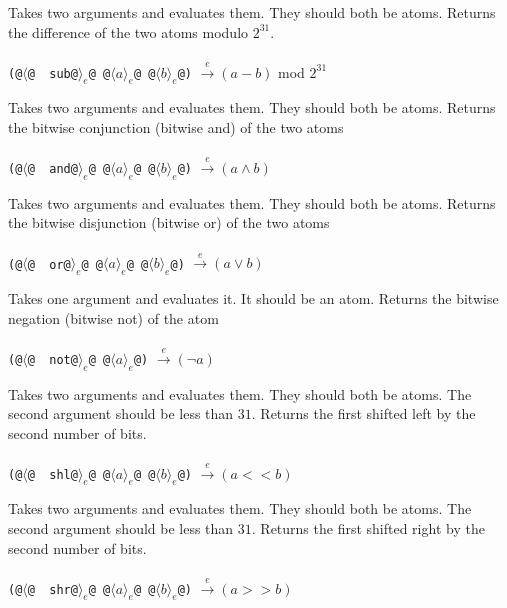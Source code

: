 \documentclass[twocolumn]{report}
\begin{document}
\begin{description}[leftmargin=1.5cm,labelwidth=1.3cm]
\item [\texttt{~~sub}]
Takes two arguments and evaluates them.
They should both be atoms.
Returns the difference of the two atoms modulo $2^{31}$. \\
\\
\texttt{(@$\langle$@~~sub@$\rangle_{e}$@ @$\langle a \rangle_{e}$@ @$\langle b \rangle_{e}$@)} $\xrightarrow{e} (a - b)$ mod $2^{31}$

\item [\texttt{~~and}]
Takes two arguments and evaluates them.
They should both be atoms.
Returns the bitwise conjunction (bitwise and) of the two atoms \\
\\
\texttt{(@$\langle$@~~and@$\rangle_{e}$@ @$\langle a \rangle_{e}$@ @$\langle b \rangle_{e}$@)} $\xrightarrow{e} (a \land b)$

\item [\texttt{~~or}]
Takes two arguments and evaluates them.
They should both be atoms.
Returns the bitwise disjunction (bitwise or) of the two atoms \\
\\
\texttt{(@$\langle$@~~or@$\rangle_{e}$@ @$\langle a \rangle_{e}$@ @$\langle b \rangle_{e}$@)} $\xrightarrow{e} (a \lor b)$

\item [\texttt{~~not}]
Takes one argument and evaluates it.
It should be an atom.
Returns the bitwise negation (bitwise not) of the atom \\
\\
\texttt{(@$\langle$@~~not@$\rangle_{e}$@ @$\langle a \rangle_{e}$@)} $\xrightarrow{e} (\neg a)$

\item [\texttt{~~shl}]
Takes two arguments and evaluates them.
They should both be atoms.
The second argument should be less than $31$.
Returns the first shifted left by the second number of bits. \\
\\
\texttt{(@$\langle$@~~shl@$\rangle_{e}$@ @$\langle a \rangle_{e}$@ @$\langle b \rangle_{e}$@)} $\xrightarrow{e} (a << b)$

\item [\texttt{~~shr}]
Takes two arguments and evaluates them.
They should both be atoms.
The second argument should be less than $31$.
Returns the first shifted right by the second number of bits. \\
\\
\texttt{(@$\langle$@~~shr@$\rangle_{e}$@ @$\langle a \rangle_{e}$@ @$\langle b \rangle_{e}$@)} $\xrightarrow{e} (a >> b)$


\end{description}
\end{document}
